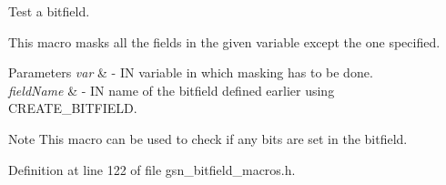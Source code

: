 Test a bitfield. 

This macro masks all the fields in the given variable except the one specified. 
\begin{DoxyParams}{Parameters}
{\em var} & -\/ IN variable in which masking has to be done. \\
\hline
{\em fieldName} & -\/ IN name of the bitfield defined earlier using CREATE\_\-BITFIELD. \\
\hline
\end{DoxyParams}
\begin{DoxyNote}{Note}
This macro can be used to check if any bits are set in the bitfield. 
\end{DoxyNote}


Definition at line 122 of file gsn\_\-bitfield\_\-macros.h.

